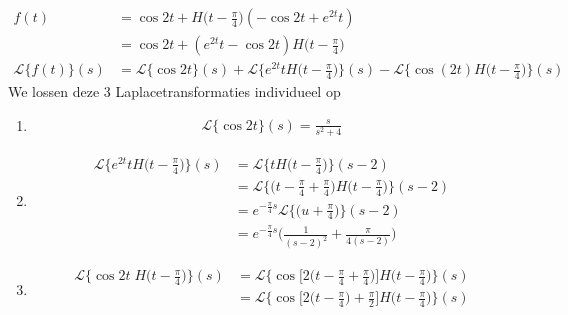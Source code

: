 \begin{itemize}[label={}]
{{    }{
        \begin{equation*}
         \begin{split}
          f(t) & = \cos 2t + H\big(t-\frac{\pi}{4}\big)(-\cos 2t + e^{2t}t) \\
               & = \cos 2t + (e^{2t}t - \cos 2t)H\big(t - \frac{\pi}{4}\big) \\
          \mathcal{L}\{f(t)\}(s) & = \mathcal{L}\{\cos 2t\}(s) + \mathcal{L}\{e^{2t}tH\big(t - \frac{\pi}{4}\big)\}(s) - \mathcal{L}\{\cos(2t)H\big(t - \frac{\pi}{4}\big)\}(s)
         \end{split}
        \end{equation*}
    We lossen deze 3 Laplacetransformaties individueel op
    \begin{enumerate}
     \item \begin{equation*}
            \begin{split}
                \mathcal{L}\{\cos 2t\}(s) = \frac{s}{s^2 + 4}
            \end{split}
           \end{equation*}
     \item \begin{equation*}
            \begin{split}
                    \mathcal{L}\{e^{2t}tH\big(t - \frac{\pi}{4}\big)\}(s) & = \mathcal{L}\{tH\big(t - \frac{\pi}{4}\big)\}(s - 2) \\
                                                                        & = \mathcal{L}\{\big(t - \frac{\pi}{4} + \frac{\pi}{4}\big)H\big(t - \frac{\pi}{4}\big)\}(s - 2) \\
                                                                        & = e^{-\frac{\pi}{4}s}\mathcal{L}\{\big(u + \frac{\pi}{4}\big)\}(s - 2) \\
                                                                        & = e^{-\frac{\pi}{4}s}\bigg(\frac{1}{(s - 2)^2} +  \frac{\pi}{4(s - 2)}\bigg)
              \end{split}
             \end{equation*}
    \item \begin{equation*}
            \begin{split}
                \mathcal{L}\{\cos 2t\;H\big(t - \frac{\pi}{4}\big)\}(s) & = \mathcal{L}\{\cos \big[2\big(t-\frac{\pi}{4} + \frac{\pi}{4}\big)\big]H\big(t - \frac{\pi}{4}\big)\}(s) \\
                                                                        & = \mathcal{L}\{\cos\big[2\big(t - \frac{\pi}{4}\big) + \frac{\pi}{2}\big]H\big(t - \frac{\pi}{4}\big)\}(s) \\

\end{split}
\end{equation*}
\end{enumerate}}}
\end{itemize}
